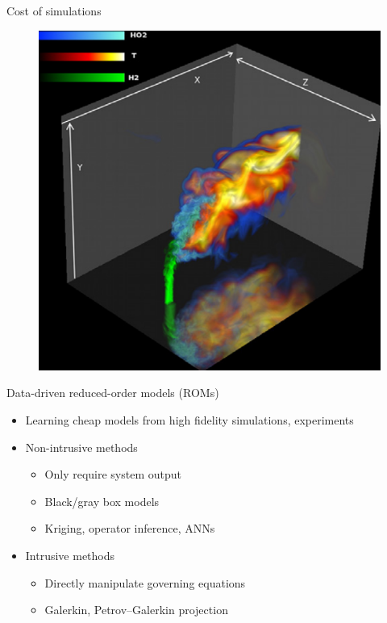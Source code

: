 \documentclass[]{beamer}
\begin{document}
\begin{frame}{Cost of simulations}
\begin{minipage}{0.3\linewidth}
\begin{figure}
		\end{figure}
	\end{minipage}
	\hspace{1cm}
	\centering
	\begin{minipage}{0.3\linewidth}
		\centering
		\begin{figure}
			\centering
			\includegraphics[width=0.95\linewidth]{jetCrossflowDNS.png}
		\end{figure}
	\end{minipage}
	
\end{frame}

\begin{frame}{Data-driven reduced-order models (ROMs)}
	\begin{itemize}
		\item Learning cheap models from high fidelity simulations, experiments
		\item Non-intrusive methods
		\begin{itemize}
			\item Only require system output
			\item Black/gray box models
			\item Kriging, operator inference, ANNs
		\end{itemize}
		\item Intrusive methods
		\begin{itemize}
			\item Directly manipulate governing equations
			\item Galerkin, Petrov--Galerkin projection
		\end{itemize}
	\end{itemize}
\end{frame}
\end{document}
